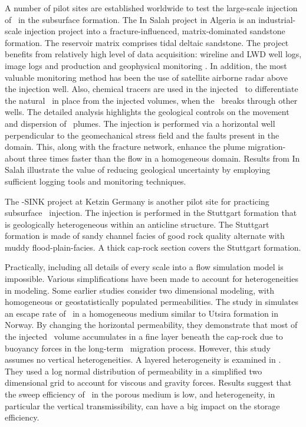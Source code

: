 A number of pilot sites are established worldwide to test the large-scale injection of \coo\ in the subsurface formation. The In Salah project \cite{riddiford2004monitoring} in Algeria is an industrial-scale injection project into a fracture-influenced, matrix-dominated sandstone formation. The reservoir matrix comprises tidal deltaic sandstone. The project benefits from relatively high level of data acquisition: wireline and LWD well logs, image logs and production and geophysical monitoring \cite{riddiford2004monitoring}. In addition, the most valuable monitoring method has been the use of satellite airborne radar above the injection well. Also, chemical tracers are used in the injected \coo\ to differentiate the natural \coo\ in place from the injected volumes, when the \coo\ breaks through other wells. The detailed analysis highlights the geological controls on the movement and dispersion of \coo\ plumes. The injection is performed via a horizontal well perpendicular to the geomechanical stress field and the faults present in the domain. This, along with the fracture network, enhance the plume migration- about three times faster than the flow in a homogeneous domain. Results from In Salah illustrate the value of reducing geological uncertainty by employing sufficient logging tools and monitoring techniques. 

The \coo-SINK project at Ketzin Germany \cite{forster2006baseline} is another pilot site for practicing subsurface \coo\ injection. The injection is performed in the Stuttgart formation that is geologically heterogeneous within an anticline structure. The Stuttgart formation is made of sandy channel facies of good rock quality alternate with muddy flood-plain-facies. A thick cap-rock section covers the Stuttgart formation.

Practically, including all details of every scale into a flow simulation model is impossible. Various simplifications have been made to account for heterogeneities in modeling. Some earlier studies consider two dimensional modeling, with homogeneous or geostatistically populated permeabilities. The study in \cite{lindeberg1997escape} simulates an escape rate of \coo\ in a homogeneous medium similar to Utsira formation in Norway. By changing the horizontal permeability, they demonstrate that most of the injected \coo\ volume accumulates in a fine layer beneath the cap-rock due to buoyancy forces in the long-term \coo\ migration process. However, this study assumes no vertical heterogeneities. A layered heterogeneity is examined in \cite{van1995co}. They used a log normal distribution of permeability in a simplified two dimensional grid to account for viscous and gravity forces. Results suggest that the sweep efficiency of \coo\ in the porous medium is low, and heterogeneity, in particular the vertical transmissibility, can have a big impact on the storage efficiency. 


